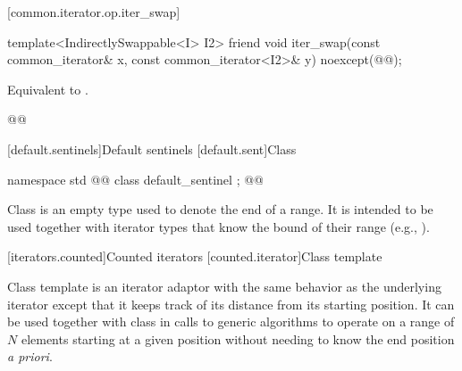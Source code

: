 \begin{addedblock}
[common.iterator.op.iter_swap]{}

%
%
\begin{itemdecl}
template<IndirectlySwappable<I> I2>
  friend void iter_swap(const common_iterator& x, const common_iterator<I2>& y)
    noexcept(@\oldtxt{\seebelow}@);
\end{itemdecl}

\begin{itemdescr}
\pnum
\requires
{}

\pnum
\effects
Equivalent to
.

\pnum
{}
\begin{codeblock}
@@
\end{codeblock}
\end{itemdescr}


[default.sentinels]{Default sentinels}
[default.sent]{Class }

%
\begin{itemdecl}
namespace std { @@
  class default_sentinel { };
}@\oldtxt{\}\}\}}@
\end{itemdecl}

\pnum
Class  is an empty type used to denote the end of a
range. It is intended to be used together with iterator types that know the bound
of their range (e.g., ).


[iterators.counted]{Counted iterators}
[counted.iterator]{Class template }

\pnum
Class template  is an iterator adaptor
with the same behavior as the underlying iterator except that it
keeps track of its distance from its starting position. It can be
used together with class  in calls to generic
algorithms to operate on a range of $N$ elements starting at a given
position without needing to know the end position \textit{a priori}.


\end{addedblock}
